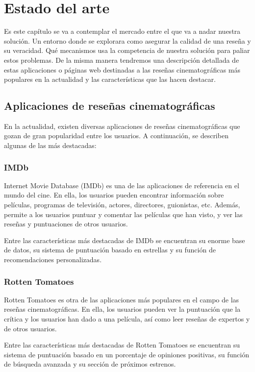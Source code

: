 \chapter{Estado del arte}

Es este capítulo se va a contemplar el mercado entre el que va a nadar nuestra solución. Un entorno donde se explorara como asegurar la calidad de una reseña y su veracidad. Qué mecanismos usa la competencia de nuestra solución para paliar estos problemas. De la misma manera tendremos una descripción detallada de estas aplicaciones o páginas web destinadas a las reseñas cinematográficas más populares en la actualidad y las características que las hacen destacar.

\section{Aplicaciones de reseñas cinematográficas}

En la actualidad, existen diversas aplicaciones de reseñas cinematográficas que gozan de gran 
popularidad entre los usuarios. A continuación, se describen algunas de las más destacadas:

\subsection{IMDb}

Internet Movie Database (IMDb) es una de las aplicaciones de referencia en el mundo del cine. En ella, 
los usuarios pueden encontrar información sobre películas, programas de televisión, actores, 
directores, guionistas, etc. Además, permite a los usuarios puntuar y comentar las películas que han 
visto, y ver las reseñas y puntuaciones de otros usuarios.

Entre las características más destacadas de IMDb se encuentran su enorme base de datos, su sistema de 
puntuación basado en estrellas y su función de recomendaciones personalizadas.

\subsection{Rotten Tomatoes}

Rotten Tomatoes es otra de las aplicaciones más populares en el campo de las reseñas cinematográficas. 
En ella, los usuarios pueden ver la puntuación que la crítica y los usuarios han dado a una película, 
así como leer reseñas de expertos y de otros usuarios.

Entre las características más destacadas de Rotten Tomatoes se encuentran su sistema de puntuación 
basado en un porcentaje de opiniones positivas, su función de búsqueda avanzada y su sección de 
próximos estrenos.

